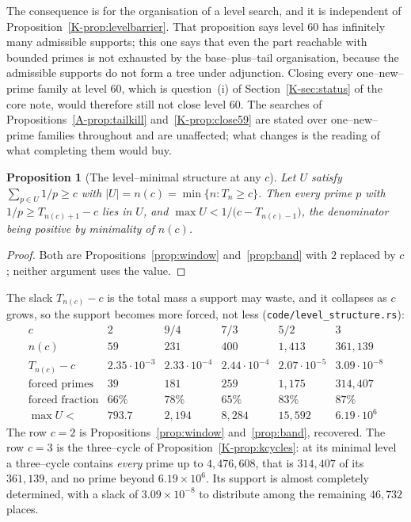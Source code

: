 \documentclass[11pt]{article}
\newtheorem{proposition}[theorem]{Proposition}
\theoremstyle{definition}
\begin{document}
The consequence is for the organisation of a level search, and it is independent of
Proposition~\ref{K-prop:levelbarrier}. That proposition says level $60$ has infinitely many admissible
supports; this one says that even the part reachable with bounded primes is not exhausted by the
base--plus--tail organisation, because the admissible supports do not form a tree under adjunction.
Closing every one--new--prime family at level $60$, which is question~(i) of
Section~\ref{K-sec:status} of the core note, would therefore still not close level $60$. The searches of
Propositions~\ref{A-prop:tailkill} and~\ref{K-prop:close59} are stated over one--new--prime families
throughout and are unaffected; what changes is the reading of what completing them would buy.

\begin{proposition}[The level--minimal structure at any $c$]\label{prop:levelstructure}
Let $U$ satisfy $\sum_{p\in U}1/p\ge c$ with $|U|=n(c)=\min\{n:T_n\ge c\}$. Then every prime $p$ with
$1/p\ge T_{n(c)+1}-c$ lies in $U$, and $\max U<1/\bigl(c-T_{n(c)-1}\bigr)$, the denominator being
positive by minimality of $n(c)$.
\end{proposition}
\begin{proof}
Both are Propositions~\ref{prop:window} and~\ref{prop:band} with $2$ replaced by $c$; neither
argument uses the value.
\end{proof}

The slack $T_{n(c)}-c$ is the total mass a support may waste, and it collapses as $c$ grows, so the
support becomes more forced, not less \textup{(\texttt{code/level\_structure.rs})}:
\[
\begin{array}{l|ccccc}
c & 2 & 9/4 & 7/3 & 5/2 & 3\\\hline
n(c) & 59 & 231 & 400 & 1{,}413 & 361{,}139\\
T_{n(c)}-c & 2.35\!\cdot\!10^{-3} & 2.33\!\cdot\!10^{-4} & 2.44\!\cdot\!10^{-4} &
  2.07\!\cdot\!10^{-5} & 3.09\!\cdot\!10^{-8}\\
\text{forced primes} & 39 & 181 & 259 & 1{,}175 & 314{,}407\\
\text{forced fraction} & 66\% & 78\% & 65\% & 83\% & 87\%\\
\max U< & 793.7 & 2{,}194 & 8{,}284 & 15{,}592 & 6.19\!\cdot\!10^{6}
\end{array}
\]
The row $c=2$ is Propositions~\ref{prop:window} and~\ref{prop:band}, recovered. The row $c=3$ is the
three--cycle of Proposition~\ref{K-prop:kcycles}: at its minimal level a three--cycle contains
\emph{every} prime up to $4{,}476{,}608$, that is $314{,}407$ of its $361{,}139$, and no prime beyond
$6.19\times10^{6}$. Its support is almost completely determined, with a slack of $3.09\times10^{-8}$
to distribute among the remaining $46{,}732$ places.
\end{document}

